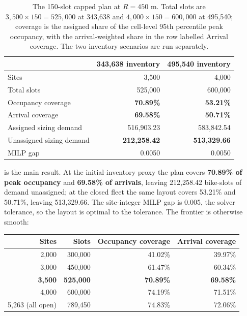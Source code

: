 \begin{table}[htbp]
\centering
\footnotesize
\caption[The capped Q4 plan]{The 150-slot capped plan at $R=450$ m. Total slots are
$3{,}500\times150=525{,}000$ at 343,638 and $4{,}000\times150=600{,}000$ at 495,540;
coverage is the assigned share of the cell-level 95th percentile peak occupancy, with
the arrival-weighted share in the row labelled Arrival coverage. The two inventory
scenarios are run separately.}
\label{tab:q4plan}
\scriptsize
\begin{tabular}{@{}lrr@{}}
\toprule
 & \textbf{343,638 inventory} & \textbf{495,540 inventory} \\
\midrule
Sites & 3,500 & 4,000 \\
Total slots & 525,000 & 600,000 \\
Occupancy coverage & \textbf{70.89\%} & \textbf{53.21\%} \\
Arrival coverage & \textbf{69.58\%} & \textbf{50.71\%} \\
Assigned sizing demand & 516,903.23 & 583,842.54 \\
Unassigned sizing demand & \textbf{212,258.42} & \textbf{513,329.66} \\
MILP gap & 0.0050 & 0.0050 \\
\bottomrule
\end{tabular}
\end{table}

 is the main result. At the initial-inventory proxy the plan covers
\textbf{70.89\% of peak occupancy} and \textbf{69.58\% of arrivals}, leaving 212,258.42
bike-slots of demand unassigned; at the closed fleet the same layout covers 53.21\% and
50.71\%, leaving 513,329.66. The site-integer MILP gap is 0.005, the solver tolerance,
so the layout is optimal to the tolerance. The frontier is otherwise smooth:

\begin{center}
\scriptsize
\begin{tabular}{@{}rrrr@{}}
\toprule
\textbf{Sites} & \textbf{Slots} & \textbf{Occupancy coverage} &
\textbf{Arrival coverage} \\
\midrule
2,000 & 300,000 & 41.02\% & 39.97\% \\
3,000 & 450,000 & 61.47\% & 60.34\% \\
\textbf{3,500} & \textbf{525,000} & \textbf{70.89\%} & \textbf{69.58\%} \\
4,000 & 600,000 & 74.19\% & 71.51\% \\
5,263 (all open) & 789,450 & 74.83\% & 72.06\% \\
\bottomrule
\end{tabular}
\end{center}

